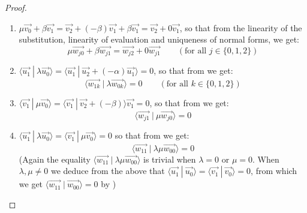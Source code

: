 \documentclass[runningheads,orivec]{llncs}
\def\scal#1#2{\langle{#1}~|~{#2}\rangle}
\begin{document}
\begin{lemma}
\begin{proof}
\begin{enumerate}
        \item\label{A9:it2} $\mu\vec{v_0} + \beta\vec{v_1}=\vec{v_2} + (-\beta) \vec{v_1} + \beta \vec{v_1} = \vec{v_2} + 0 \vec{v_1}$, so that from the linearity of the substitution, linearity of evaluation and uniqueness of normal forms, we get:
        \[
        \mu\vec{w_{j0}} + \beta \vec{w_{j1}} = \vec{w_{j2}} + 0 \vec{w_{j1}} \qquad(\text{for all }j\in\{0,1,2\})
        \]
        
        \item\label{A9:it3} $\scal{\vec{u_1}}{\lambda\vec{u_0}}=\scal{\vec{u_1}}{\vec{u_2}+(- \alpha)\vec{u_1}}=0$, so that from  we get:
        \[
        \scal{\vec{w_{1k}}}{\lambda\vec{w_{0k}}}= 0 \qquad(\text{for all }k\in\{0,1,2\})
        \]
        
        \item\label{A9:it4} $\scal{\vec{v_1}}{\mu\vec{v_0}}=\scal{\vec{v_1}}{\vec{v_2} + (-\beta)}\vec{v_1}=0$, so that from  we get:
        \[
        \scal{\vec{w_{j1}}}{\mu\vec{w_{j0}}}=0
        \]
                
        \item\label{A9:it5} $\scal{\vec{u_1}}{\lambda\vec{u_0}}=\scal{\vec{v_1}}{\mu\vec{v_0}}=0$ so that from  we get:
        \[
        \scal{\vec{w_{11}}}{\lambda\mu\vec{w_{00}}}=0
        \]
        (Again the equality $\scal{\vec{w_{11}}}{\lambda\mu\vec{w_{00}}}$ is trivial when $\lambda=0$ or $\mu=0$. When $\lambda ,\mu\neq 0$ we deduce from the above that $\scal{\vec{u_1}}{\vec{u_0}}=\scal{\vec{v_1}}{\vec{v_0}}=0$, from which we get $\scal{\vec{w_{11}}}{\vec{w_{00}}}=0$ by )
    \end{enumerate}


\end{proof}
\end{lemma}
\end{document}
